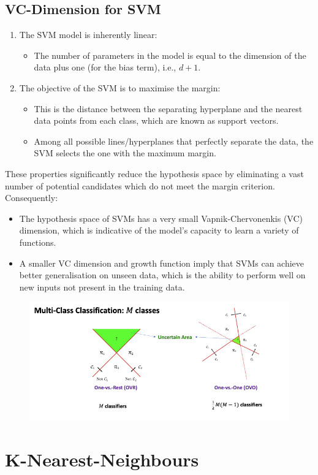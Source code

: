 \subsection{VC-Dimension for SVM}
\begin{enumerate}
    \item The SVM model is inherently linear:
    \begin{itemize}
        \item The number of parameters in the model is equal to the dimension of the data plus one (for the bias term), i.e., \( d+1 \).
    \end{itemize}
    \item The objective of the SVM is to maximise the margin:
    \begin{itemize}
        \item This is the distance between the separating hyperplane and the nearest data points from each class, which are known as support vectors.
        \item Among all possible lines/hyperplanes that perfectly separate the data, the SVM selects the one with the maximum margin.
    \end{itemize}
\end{enumerate}

These properties significantly reduce the hypothesis space by eliminating a vast number of potential candidates which do not meet the margin criterion. Consequently:

\begin{itemize}
    \item The hypothesis space of SVMs has a very small Vapnik-Chervonenkis (VC) dimension, which is indicative of the model's capacity to learn a variety of functions.
    \item A smaller VC dimension and growth function imply that SVMs can achieve better generalisation on unseen data, which is the ability to perform well on new inputs not present in the training data.
\end{itemize}



\begin{figure}[H]
    \centering
    \includegraphics[width=0.75\linewidth]{img/multiclass.png}
\end{figure}


\section{K-Nearest-Neighbours}
